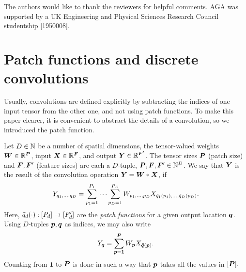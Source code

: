 \documentclass[accepted]{uai2021} %
\newcommand{\layersizebase}{\vF}
\newcommand{\patchsizebase}{\vP}
\newcommand{\patchf}[2]{{\tilde#1\bra{#2}}}
\newcommand{\patch}{\vp}               %
\newcommand{\patchs}{p}               %
\newcommand{\nextpatch}{\vq}
\newcommand{\nextpatchs}{q}
\newcommand{\0}{\boldsymbol{0}}
\newcommand{\1}{\boldsymbol{1}}
\begin{document}
\begin{acknowledgements}
The authors would like to thank the reviewers for helpful comments.
AGA was supported by a UK Engineering and Physical Sciences Research Council studentship [1950008].
\end{acknowledgements}



\cleardoublepage

\appendix %
\section{Patch functions and discrete convolutions} \label{app:patchf}
Usually, convolutions are defined explicitly by subtracting the indices of one input tensor from the other one, and not using patch functions. To make this paper clearer, it is convenient to abstract the details of a convolution, so we introduced the patch function.

\begin{definition}
  \label{def:convolution}
  Let $D \in {\mathbb{N}}$ be a number of spatial dimensions, the tensor-valued weights
  $\mW\in \sR^{\patchsizebase}$, input ${\bm{X}}\in {\mathbb{R}}^{{\bm{F}}}$, and output ${\bm{Y}} \in {\mathbb{R}}^{{\bm{F}}'}$.
  The tensor sizes $\patchsizebase$ (patch size) and $\layersizebase,\layersizebase'$ (feature sizes) are each a
  $D$-tuple, $\patchsizebase,\layersizebase,\layersizebase' \in \sN^{D}$.
  We say that ${\bm{Y}}$ is the result of the convolution operation ${\bm{Y}} = {\bm{W}}*{\bm{X}}$, if
  \begin{equation}
    Y_{\nextpatchs_{1},\dots,\nextpatchs_{D}} = \sum_{\patchs_{1}=1}^{P_{1}} \dots \sum_{\patchs_{D}=1}^{P_{D}} W_{\patchs_{1},\dots,\patchs_{D}} X_{\patchf{\nextpatchs_{1}}{\patchs_{1}}, \dots, \patchf{\nextpatchs_{D}}{\patchs_{D}}}.
    \label{eq:def-convolution-no-tuples}
  \end{equation}
  Here, $\patchf{\nextpatchs_{d}}{\cdot} : \countto{P_{d}} \to \countto{F'_{d}}$ are the \emph{patch functions} for a given output location $\nextpatch$. Using $D$-tuples $\patch,\nextpatch$ as indices, we may also write
  \begin{equation}
    Y_{\nextpatch} = \sum_{\patch=\1}^{\vP} W_{\patch} X_{\patchf{\nextpatch}{\patch}}.
    \label{eq:def-convolution-tuples}
  \end{equation}
  Counting from $\1$ to $\patchsizebase$ is done in such a way that $\patch$ takes all the values in $\countto{\patchsizebase}.$
  \end{definition}
\end{document}
